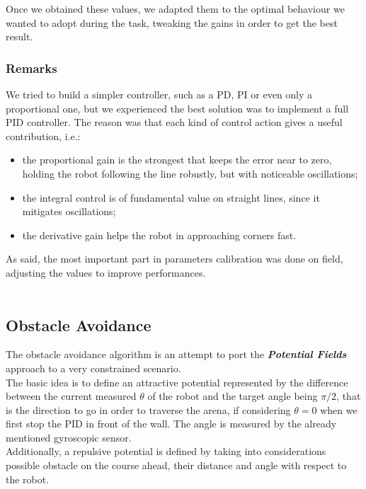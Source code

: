 \documentclass[a4paper,11pt,oneside]{book}
\begin{document}
			Once we obtained these values, we adapted them to the optimal behaviour we wanted to adopt during the task, tweaking the gains in order to get the best result.\\
			
			\subsubsection{Remarks}
			We tried to build a simpler controller, such as a PD, PI or even only a proportional one, but we experienced the best solution was to implement a full PID controller. The reason was that each kind of control action gives a useful contribution, i.e.:
			\begin{itemize}
				\item the proportional gain is the strongest that keeps the error near to zero, holding the robot following the line robustly, but with noticeable oscillations;
				\item the integral control is of fundamental value on straight lines, since it mitigates oscillations;
				\item the derivative gain helps the robot in approaching corners fast.
			\end{itemize} 
			
			As said, the most important part in parameters calibration was done on field, adjusting the values to improve performances.\\\\
			
			
			\subsection {Obstacle Avoidance}
			
			The obstacle avoidance algorithm is an attempt to port the \textbf{\emph{Potential Fields}} approach to a very constrained scenario.\\
			The basic idea is to define an attractive potential represented by the difference between the current measured $\theta$ of the robot and the target angle being $\pi/2$, that is the direction to go in order to traverse the arena, if considering  $\theta=0$ when we first stop the PID in front of the wall. The angle is measured by the already mentioned gyroscopic sensor.\\
			Additionally, a repulsive potential is defined by taking into considerations possible obstacle on the course ahead, their distance and angle with respect to the robot.\\
			
\end{document}
